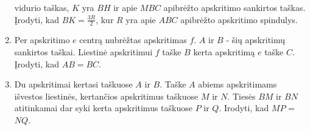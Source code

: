 \begin{enumerate}
    vidurio taškas, $K$ yra $BH$ ir apie $MBC$ apibrėžto apskritimo
    sankirtos taškas. Įrodyti, kad $BK=\frac{3R}{2}$, kur $R$ yra 
    apie $ABC$ apibrėžto apskritimo spindulys.
  \item Per apskritimo $e$ centrą nubrėžtas apskritimas $f$.
    $A$ ir $B$ - šių apskritimų sankirtos taškai. Liestinė
    apskritimui $f$ taške $B$  kerta apskritimą $e$ taške $C$.
    Įrodyti, kad $AB=BC$.   
  \item Du apskritimai kertasi taškuose $A$ ir $B$. Taške $A$
    abiems apskritimams išvestos liestinės, kertančios
    apskritimus taškuose $M$ ir $N$. Tiesės $BM$ ir $BN$
    atitinkamai dar syki kerta apskritimus taškuose $P$ ir
    $Q$. Irodyti, kad $MP$ = $NQ$.  

\end{enumerate}
